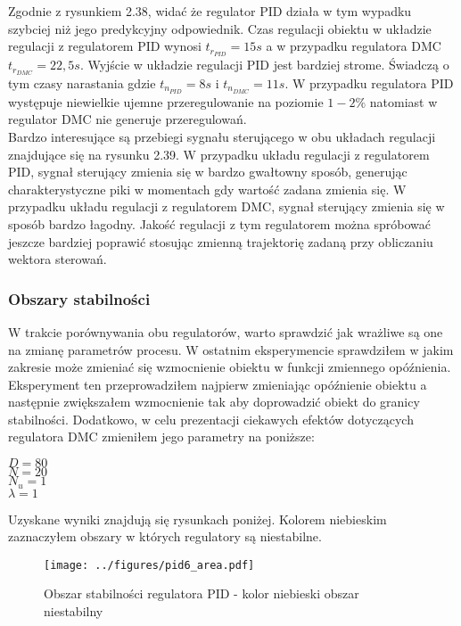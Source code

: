 \documentclass[a4paper,titlepage,11pt,floatssmall]{mwrep}
\begin{document}
Zgodnie z rysunkiem 2.38, widać że regulator PID działa w tym wypadku szybciej niż jego predykcyjny odpowiednik. Czas regulacji obiektu w układzie regulacji z regulatorem PID wynosi $t_{r_{PID}} = 15s$ a w przypadku regulatora DMC $t_{r_{DMC}} = 22,5s$. Wyjście w układzie regulacji PID jest bardziej strome. Świadczą o tym czasy narastania gdzie $t_{n_{PID}} = 8s$ i $t_{n_{DMC}} = 11s$. W przypadku regulatora PID występuje niewielkie ujemne przeregulowanie na poziomie $1-2\%$ natomiast w regulator DMC nie generuje przeregulowań.\\

\indent Bardzo interesujące są przebiegi sygnału sterującego w obu układach regulacji znajdujące się na rysunku 2.39. W przypadku układu regulacji z regulatorem PID, sygnał sterujący zmienia się w bardzo gwałtowny sposób, generując charakterystyczne piki w momentach gdy wartość zadana zmienia się. W przypadku układu regulacji z regulatorem DMC, sygnał sterujący zmienia się w sposób bardzo łagodny. Jakość regulacji z tym regulatorem można spróbować jeszcze bardziej poprawić stosując zmienną trajektorię zadaną przy obliczaniu wektora sterowań. 

\subsubsection{Obszary stabilności}

W trakcie porównywania obu regulatorów, warto sprawdzić jak wrażliwe są one na zmianę parametrów procesu. W ostatnim eksperymencie sprawdziłem w jakim zakresie może zmieniać się wzmocnienie obiektu w funkcji zmiennego opóźnienia. Eksperyment ten przeprowadziłem najpierw zmieniając opóźnienie obiektu a następnie zwiększałem wzmocnienie tak aby doprowadzić obiekt do granicy stabilności. Dodatkowo, w celu prezentacji ciekawych efektów dotyczących regulatora DMC zmieniłem jego parametry na poniższe: 
\begin{center}
	$D = 80$ \\
	$N = 20$ \\
	$N_u = 1$ \\
	$\lambda = 1$\\
\end{center}

Uzyskane wyniki znajdują się rysunkach poniżej. Kolorem niebieskim zaznaczyłem obszary w których regulatory są niestabilne.

\begin{figure}[H]
\centering
\texttt{[image: ../figures/pid6\_area.pdf]}
\caption{Obszar stabilności regulatora PID - kolor niebieski obszar niestabilny}
\end{figure}
\end{document}
